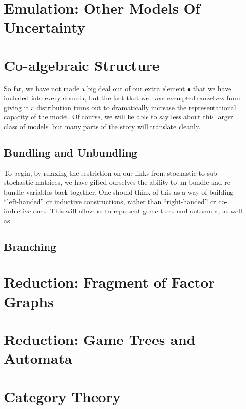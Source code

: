 \documentclass{article}
\begin{document}
	\section{Emulation: Other Models Of Uncertainty}
	
	
	\section{Co-algebraic Structure}
	So far, we have not made a big deal out of our extra element $\bullet$ that we have included into every domain, but the fact that we have exempted ourselves from giving it a distribution turns out to dramatically increase the representational capacity of the model. Of course, we will be able to say less about this larger class of models, but many parts of the story will translate cleanly.
	
	\subsection{Bundling and Unbundling} 
	To begin, by relaxing the restriction on our links from stochastic to sub-stochastic matrices, we have gifted ourselves the ability to un-bundle and re-bundle variables back together. One should think of this as a way of building ``left-handed'' or inductive constructions, rather than ``right-handed'' or co-inductive ones. This will allow us to represent game trees and automata, as well as
	
	\begin{center}
		\begin{tikzpicture}
		
		\end{tikzpicture}
	\end{center}
	
	\subsection{Branching}
	


	\section{Reduction: Fragment of Factor Graphs}
	\section{Reduction: Game Trees and Automata}


	\section{Category Theory}
\end{document}

